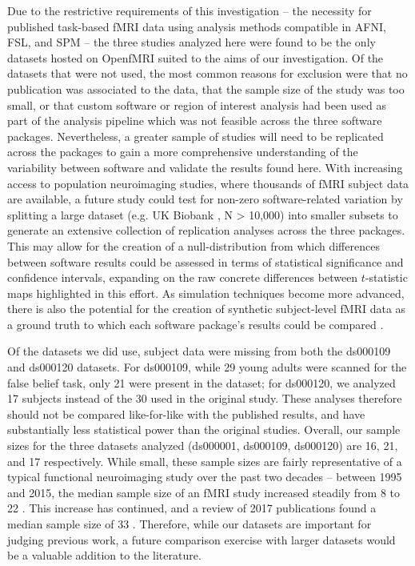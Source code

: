 Due to the restrictive requirements of this investigation -- the necessity for published task-based fMRI data using analysis methods compatible in AFNI, FSL, and SPM -- the three studies analyzed here were found to be the only datasets hosted on OpenfMRI suited to the aims of our investigation. Of the datasets that were not used, the most common reasons for exclusion were that no publication was associated to the data, that the sample size of the study was too small, or that custom software or region of interest analysis had been used as part of the analysis pipeline which was not feasible across the three software packages. Nevertheless, a greater sample of studies will need to be replicated across the packages to gain a more comprehensive understanding of the variability between software and validate the results found here. With increasing access to population neuroimaging studies, where thousands of fMRI subject data are available, a future study could test for non-zero software-related variation by splitting a large dataset (e.g. UK Biobank \citep{Alfaro-Almagro2018-ip}, N > 10,000) into smaller subsets to generate an extensive collection of replication analyses across the three packages. This may allow for the creation of a null-distribution from which differences between software results could be assessed in terms of statistical significance and confidence intervals, expanding on the raw concrete differences between $t$-statistic maps highlighted in this effort. As simulation techniques become more advanced, there is also the potential for the creation of synthetic subject-level fMRI data as a ground truth to which each software package's results could be compared \citep{Ellis2019-zi}. 

Of the datasets we did use, subject data were missing from both the ds000109 and ds000120 datasets. For ds000109, while 29 young adults were scanned for the false belief task, only 21 were present in the dataset; for ds000120, we analyzed 17 subjects instead of the 30 used in the original study. These analyses therefore should not be compared like-for-like with the published results, and have substantially less statistical power than the original studies. Overall, our sample sizes for the three datasets analyzed (ds000001, ds000109, ds000120) are 16, 21, and 17 respectively. While small, these sample sizes are fairly representative of a typical functional neuroimaging study over the past two decades -- between 1995 and 2015, the median sample size of an fMRI study increased steadily from 8 to 22 \citep{Poldrack2017-rr}. This increase has continued, and a review of 2017 publications found a median sample size of 33 \citep{Yeung2018-kr}. Therefore, while our datasets are important for judging previous work, a future comparison exercise with larger datasets would be a valuable addition to the literature.

